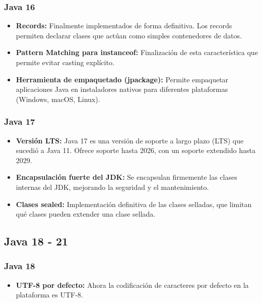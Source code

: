 \begin{center}
\begin{itemize}
	\end{itemize}

	\subsubsection{Java 16}
	\begin{itemize}
		\item \textbf{Records: }Finalmente implementados de forma definitiva. Los records permiten
		      declarar clases que actúan como simples contenedores de datos.

		\item \textbf{Pattern Matching para instanceof:} Finalización de esta característica
		      que permite evitar casting explícito.

		\item \textbf{Herramienta de empaquetado (jpackage):} Permite empaquetar aplicaciones Java en
		      instaladores nativos para diferentes plataformas (Windows, macOS, Linux).

	\end{itemize}

	\subsubsection{Java 17}
	\begin{itemize}
		\item \textbf{Versión LTS:} Java 17 es una versión de soporte a largo plazo (LTS)
		      que sucedió a Java 11. Ofrece soporte hasta 2026, con un soporte extendido hasta 2029.

		\item \textbf{Encapsulación fuerte del JDK:} Se encapsulan firmemente las clases internas del JDK,
		      mejorando la seguridad y el mantenimiento.

		\item \textbf{Clases sealed:} Implementación definitiva de las clases selladas,
		      que limitan qué clases pueden extender una clase sellada.

	\end{itemize}

	\subsection{Java 18 - 21}
	\subsubsection{Java 18}
	\begin{itemize}
		\item \textbf{UTF-8 por defecto:} Ahora la codificación de caracteres por defecto
		      en la plataforma es UTF-8.


\end{itemize}
\end{center}
